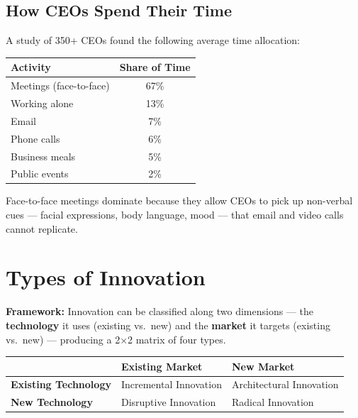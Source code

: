 \documentclass[11pt, letterpaper]{article}
\begin{document}
\subsection{How CEOs Spend Their Time}

A study of 350+ CEOs found the following average time allocation:

\begin{center}
\begin{tabular}{lc}
\toprule
\textbf{Activity} & \textbf{Share of Time} \\
\midrule
Meetings (face-to-face) & 67\% \\
Working alone & 13\% \\
Email & 7\% \\
Phone calls & 6\% \\
Business meals & 5\% \\
Public events & 2\% \\
\bottomrule
\end{tabular}
\end{center}

Face-to-face meetings dominate because they allow CEOs to pick up non-verbal cues --- facial expressions, body language, mood --- that email and video calls cannot replicate.

\newpage

\section{Types of Innovation}

\begin{defbox}
\textbf{Framework:} Innovation can be classified along two dimensions --- the \textbf{technology} it uses (existing vs.\ new) and the \textbf{market} it targets (existing vs.\ new) --- producing a 2×2 matrix of four types.
\end{defbox}

\begin{center}
\begin{tabular}{p{3cm} p{4.5cm} p{4.5cm}}
\toprule
 & \textbf{Existing Market} & \textbf{New Market} \\
\midrule
\textbf{Existing Technology} & Incremental Innovation & Architectural Innovation \\
\addlinespace
\textbf{New Technology} & Disruptive Innovation & Radical Innovation \\
\bottomrule
\end{tabular}
\end{center}
\end{document}
